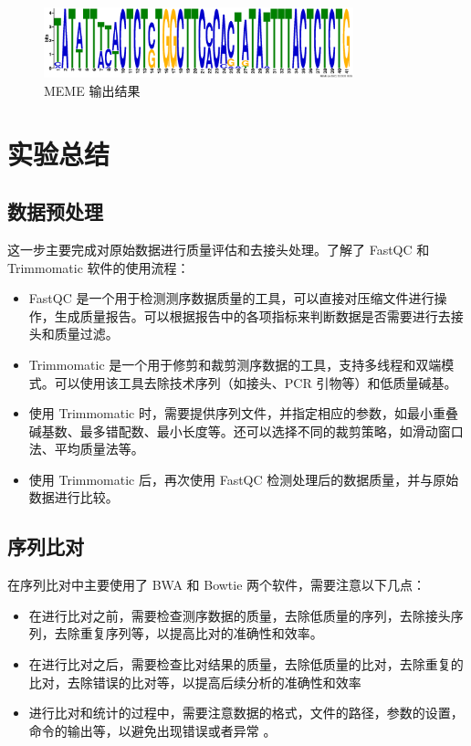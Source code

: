 \documentclass[UTF8]{ctexart}
\begin{document}
\begin{figure}
	\centering
	\includegraphics[width=0.8\textwidth]{img/meme_out/logo3.eps}
	\caption{MEME 输出结果}
\end{figure}

\clearpage

\section{实验总结}

\subsection{数据预处理}

这一步主要完成对原始数据进行质量评估和去接头处理。了解了 FastQC 和 Trimmomatic 软件的使用流程：

\begin{itemize}
	\item FastQC 是一个用于检测测序数据质量的工具，可以直接对压缩文件进行操作，生成质量报告。可以根据报告中的各项指标来判断数据是否需要进行去接头和质量过滤。
	\item Trimmomatic 是一个用于修剪和裁剪测序数据的工具，支持多线程和双端模式。可以使用该工具去除技术序列（如接头、PCR 引物等）和低质量碱基。
	\item 使用 Trimmomatic 时，需要提供序列文件，并指定相应的参数，如最小重叠碱基数、最多错配数、最小长度等。还可以选择不同的裁剪策略，如滑动窗口法、平均质量法等。
	\item 使用 Trimmomatic 后，再次使用 FastQC 检测处理后的数据质量，并与原始数据进行比较。
\end{itemize}

\subsection{序列比对}

在序列比对中主要使用了 BWA 和 Bowtie 两个软件，需要注意以下几点：

\begin{itemize}
	\item 在进行比对之前，需要检查测序数据的质量，去除低质量的序列，去除接头序列，去除重复序列等，以提高比对的准确性和效率。
	\item 在进行比对之后，需要检查比对结果的质量，去除低质量的比对，去除重复的比对，去除错误的比对等，以提高后续分析的准确性和效率
	\item 进行比对和统计的过程中，需要注意数据的格式，文件的路径，参数的设置，命令的输出等，以避免出现错误或者异常 。
\end{itemize}
\end{document}

